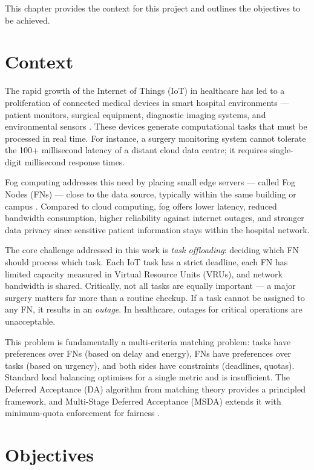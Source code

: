 This chapter provides the context for this project and outlines the objectives to be achieved.

\section{Context}

The rapid growth of the Internet of Things (IoT) in healthcare has led to a proliferation of connected medical devices in smart hospital environments --- patient monitors, surgical equipment, diagnostic imaging systems, and environmental sensors \cite{swain2024mdafto}. These devices generate computational tasks that must be processed in real time. For instance, a surgery monitoring system cannot tolerate the 100+ millisecond latency of a distant cloud data centre; it requires single-digit millisecond response times.

Fog computing addresses this need by placing small edge servers --- called Fog Nodes (FNs) --- close to the data source, typically within the same building or campus \cite{chiti2018matching}. Compared to cloud computing, fog offers lower latency, reduced bandwidth consumption, higher reliability against internet outages, and stronger data privacy since sensitive patient information stays within the hospital network.

The core challenge addressed in this work is \textit{task offloading}: deciding which FN should process which task. Each IoT task has a strict deadline, each FN has limited capacity measured in Virtual Resource Units (VRUs), and network bandwidth is shared. Critically, not all tasks are equally important --- a major surgery matters far more than a routine checkup. If a task cannot be assigned to any FN, it results in an \textit{outage}. In healthcare, outages for critical operations are unacceptable.

This problem is fundamentally a multi-criteria matching problem: tasks have preferences over FNs (based on delay and energy), FNs have preferences over tasks (based on urgency), and both sides have constraints (deadlines, quotas). Standard load balancing optimises for a single metric and is insufficient. The Deferred Acceptance (DA) algorithm from matching theory \cite{gale1962college} provides a principled framework, and Multi-Stage Deferred Acceptance (MSDA) extends it with minimum-quota enforcement for fairness \cite{fragiadakis2016strategyproof}.

\section{Objectives}

